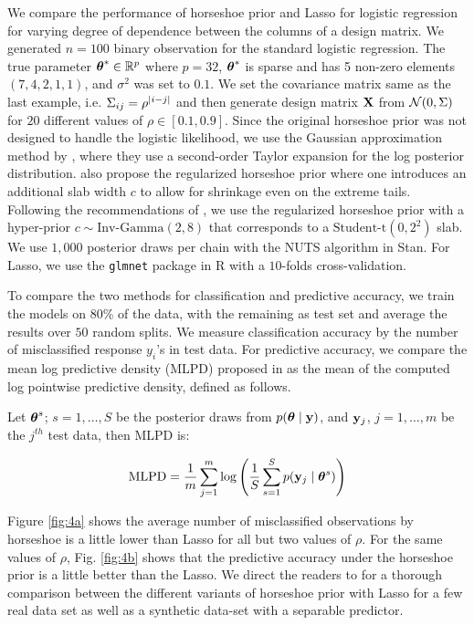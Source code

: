 \documentclass[sts,preprint]{imsart}
\begin{document}
We compare the performance of horseshoe prior and Lasso for logistic regression for varying degree of dependence between the columns of a design matrix. We generated $n = 100$ binary observation for the standard logistic regression. The true parameter $\boldsymbol{\theta}^* \in \mathbb{R}^p$ where $p = 32$, $\boldsymbol{\theta}^*$ is sparse and has 5 non-zero elements $(7, 4, 2, 1, 1)$, and $\sigma^2$ was set to $0.1$. We set the covariance matrix same as the last example, i.e. $\Sigma_{ij} = \rho^{\lvert i-j\rvert}$ and then generate design matrix ${\bf X}$ from ${\cal N}(0, \Sigma)$ for $20$ different values of $\rho \in [0.1, 0.9]$. Since the original horseshoe prior was not designed to handle the logistic likelihood, we use the Gaussian approximation method by \cite{piironen2017sparsity}, where they use a second-order Taylor expansion for the log posterior distribution. \cite{piironen2017sparsity} also propose the regularized horseshoe prior where one introduces an additional slab width $c$ to allow for shrinkage even on the extreme tails. Following the recommendations of \cite{piironen2017sparsity}, we use the regularized horseshoe prior with a hyper-prior $c \sim \text{Inv-Gamma}(2,8)$ that corresponds to a $\text{Student-t}(0, 2^2)$ slab. We use $1,000$ posterior draws per chain with the NUTS algorithm in Stan. For Lasso, we use the \texttt{glmnet} package in R with a $10$-folds cross-validation. 

To compare the two methods for classification and predictive accuracy, we train the models on 80\% of the data, with the remaining as test set and average the results over $50$ random splits. We measure classification accuracy by the number of misclassified response $y_i$'s in test data. For predictive accuracy, we compare the mean log predictive density (MLPD) proposed in \cite{gelman2014understanding} as the mean of the computed log pointwise predictive density, defined as follows. 

Let $\boldsymbol{\theta}^s$; $s = 1, \ldots, S$ be the posterior draws from $p(\boldsymbol{\theta} \mid {\bf y})$, and ${\bf y}_j$, $j = 1, \ldots, m$ be the $j^{th}$ test data, then MLPD is:

\begin{equation}
\text{MLPD} = \frac{1}{m} \sum_{j=1}^{m} \log \left( \frac{1}{S} \sum_{s=1}^{S} p({\bf y}_j \mid \boldsymbol{\theta}^s) \right)
\label{eq:mlpd}
\end{equation}

Figure \ref{fig:4a} shows the average number of misclassified observations by horseshoe is a little lower than Lasso for all but two values of $\rho$. For the same values of $\rho$, Fig. \ref{fig:4b} shows that the predictive accuracy under the horseshoe prior is a little better than the Lasso. We direct the readers to \cite{piironen2017sparsity} for a thorough comparison between the different variants of horseshoe prior with Lasso for a few real data set as well as a synthetic data-set with a separable predictor.
\end{document}
